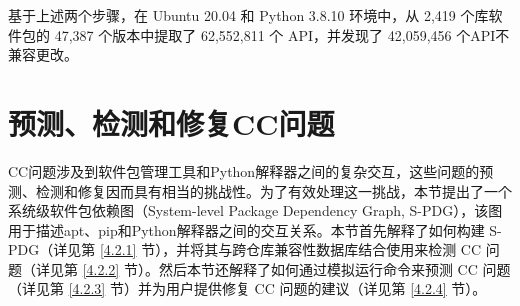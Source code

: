 基于上述两个步骤，在 Ubuntu 20.04 和 Python 3.8.10 环境中，\tool{}从 2,419 个库软件包的 47,387 个版本中提取了 62,552,811 个 API，并发现了 42,059,456 个API不兼容更改。

\section{预测、检测和修复CC问题}\label{4.2}
CC问题涉及到软件包管理工具和Python解释器之间的复杂交互，这些问题的预测、检测和修复因而具有相当的挑战性。为了有效处理这一挑战，本节提出了一个系统级软件包依赖图（System-level Package Dependency Graph, S-PDG），该图用于描述apt、pip和Python解释器之间的交互关系。本节首先解释了如何构建 S-PDG（详见第 \ref{4.2.1} 节），并将其与跨仓库兼容性数据库结合使用来检测 CC 问题（详见第 \ref{4.2.2} 节）。然后本节还解释了如何通过模拟运行命令来预测 CC 问题（详见第 \ref{4.2.3} 节）并为用户提供修复 CC 问题的建议（详见第 \ref{4.2.4} 节）。
